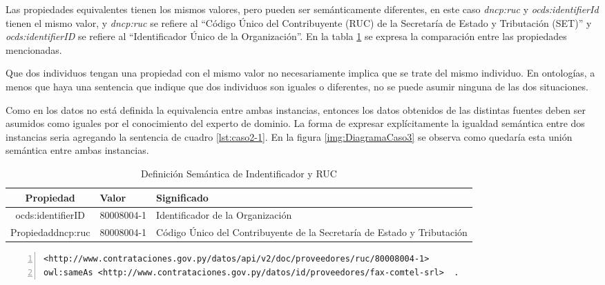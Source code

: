  Las propiedades equivalentes tienen los mismos valores, pero pueden ser semánticamente diferentes, en este caso \textit{dncp:ruc} y \textit{ocds:identifierId} tienen el mismo valor, y \textit{dncp:ruc} se refiere al “Código Único del Contribuyente (RUC) de la Secretaría de Estado y Tributación (SET)” y \textit{ocds:identifierID} se refiere al “Identificador Único de la Organización”. En la tabla \ref{table:semanticaID} se expresa la comparación entre las propiedades mencionadas.

 Que dos individuos tengan una propiedad con el mismo valor no necesariamente implica que se trate del mismo individuo. En ontologías, a menos que haya una sentencia que indique que dos individuos son iguales o diferentes, no se puede asumir ninguna de las dos situaciones. 

 Como en los datos no está definida la equivalencia entre ambas instancias, entonces los datos obtenidos de las distintas fuentes deben ser asumidos como iguales por el conocimiento del experto de dominio. La forma de expresar explícitamente la igualdad semántica entre dos instancias seria agregando la sentencia de cuadro \ref{lst:caso2-1}. En la figura \ref{img:DiagramaCaso3} se observa como quedaría esta unión semántica entre ambas instancias.
 


 \begin{table}[!htb]
    \centering
    \caption{Definición Semántica de Indentificador y RUC}
    \label{table:semanticaID}
    \resizebox{15cm}{!} {
    \begin{tabular}{|c|l|l|}
    \hline
    
Propiedad & Valor &  Significado \\ \hline

ocds:identifierID  & 80008004-1 &  Identificador de la Organización \\ \hline
Propiedaddncp:ruc & 80008004-1 &  Código Único del Contribuyente de la Secretaría de Estado y Tributación \\ \hline

    \end{tabular}
    }
    \end{table}



    \begin{lstlisting}[captionpos=b, caption=Declaracion de igualdad semantica de dos instancias, label=lst:caso2-1,  numbers=left,  numberstyle=\tiny\color{mygray},
        basicstyle=\tiny,frame=single]
<http://www.contrataciones.gov.py/datos/api/v2/doc/proveedores/ruc/80008004-1> 
owl:sameAs <http://www.contrataciones.gov.py/datos/id/proveedores/fax-comtel-srl>  .

     \end{lstlisting}

